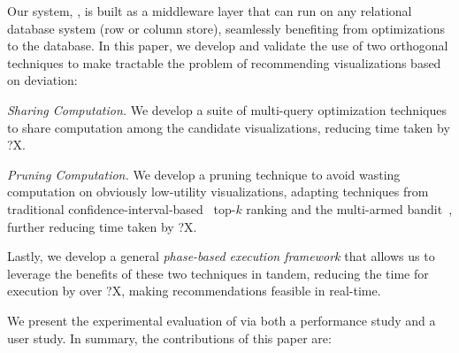 Our system, \SeeDB, is built as a middleware layer that can run on any 
relational database system (row or column store), 
seamlessly benefiting from optimizations to 
the database. 
In this paper, we develop and validate the use of  
two orthogonal techniques to make tractable the problem
of recommending visualizations based on deviation:
\begin{denselist}
\item {\em Sharing Computation.} 
We develop a suite of multi-query optimization techniques to share computation
among the candidate visualizations,
reducing time taken by ?X. 
\item {\em Pruning Computation.}
We develop a pruning technique to avoid wasting computation
on obviously low-utility visualizations, adapting
techniques from traditional 
  confidence-interval-based~\cite{hoeffding1963probability} 
  top-$k$ ranking and the
  multi-armed bandit~\cite{bandits},
  further reducing time taken by ?X. 
\end{denselist}
Lastly, we develop a general {\em phase-based execution framework}
that allows us to leverage the benefits of these two techniques
in tandem, reducing the time for execution by over ?X,
making recommendations feasible in real-time. 

We present the experimental evaluation of \SeeDB 
via both a performance study and a user study.
In summary, the contributions of this paper are:


